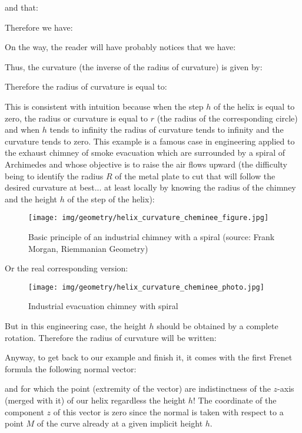 {\begin{tcolorbox}[colframe=black,colback=white,sharp corners]
	and that:
	
	\end{tcolorbox}
	
	\pagebreak
	\begin{tcolorbox}[colframe=black,colback=white,sharp corners]
	
	Therefore we have:
	
	On the way, the reader will have probably notices that we have:
	
	Thus, the curvature (the inverse of the radius of curvature) is given by:
	
	Therefore the radius of curvature is equal to:
	
	This is consistent with intuition because when the step $h$ of the helix is equal to zero, the radius or curvature is equal to $r$ (the radius of the corresponding circle) and when $h$ tends to infinity the radius of curvature tends to infinity and the curvature tends to zero. This example is a famous case in engineering applied to the exhaust chimney of smoke evacuation which are surrounded by a spiral of Archimedes and whose objective is to raise the air flows upward (the difficulty being to identify the radius $R$ of the metal plate to cut that will follow the desired curvature at best... at least locally by knowing the radius of the chimney and the height $h$ of the step of the helix):
	\begin{figure}[H]
		\centering
		\texttt{[image: img/geometry/helix\_curvature\_cheminee\_figure.jpg]}
		\caption[]{Basic principle of an industrial chimney with a spiral (source: Frank Morgan, Riemmanian Geometry)}
	\end{figure}
	\end{tcolorbox}
	
	\pagebreak
	\begin{tcolorbox}[colframe=black,colback=white,sharp corners]
	Or the real corresponding version:
	\begin{figure}[H]
		\centering
		\texttt{[image: img/geometry/helix\_curvature\_cheminee\_photo.jpg]}
		\caption[]{Industrial evacuation chimney with spiral}
	\end{figure}
	But in this engineering case, the height $h$ should be obtained by a complete rotation. Therefore the radius of curvature will be written:
	
	Anyway, to get back to our example and finish it, it comes with the first Frenet formula the following normal vector:
	
	and for which the point (extremity of the vector) are indistinctness of the $z$-axis (merged with it) of our helix regardless the height $h$! The coordinate of the component $z$ of this vector is zero since the normal is taken with respect to a point $M$ of the curve already at a given implicit height $h$.
	

\end{tcolorbox}}
